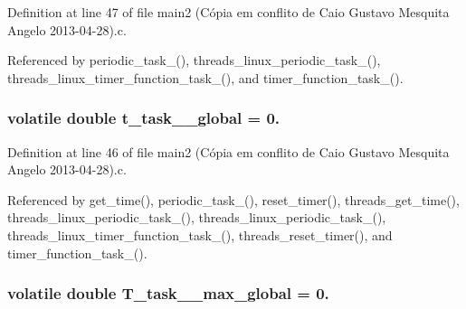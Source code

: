 Definition at line 47 of file main2 (\-Cópia em conflito de Caio Gustavo Mesquita Angelo 2013-\/04-\/28).\-c.



Referenced by periodic\-\_\-task\-\_(), threads\-\_\-linux\-\_\-periodic\-\_\-task\-\_(), threads\-\_\-linux\-\_\-timer\-\_\-function\-\_\-task\-\_(), and timer\-\_\-function\-\_\-task\-\_().

\hypertarget{main2_01_07C_xC3_xB3pia_01em_01conflito_01de_01Caio_01Gustavo_01Mesquita_01Angelo_012013-04-28_08_8c_a2a2a647912528f7aa86812528dbfe02f}{
\subsubsection[{t\-\_\-task\-\_\-1\-\_\-global}]{\setlength{\rightskip}{0pt plus 5cm}volatile double t\-\_\-task\-\_\-\_\-global = 0.}}\label{main2_01_07C_xC3_xB3pia_01em_01conflito_01de_01Caio_01Gustavo_01Mesquita_01Angelo_012013-04-28_08_8c_a2a2a647912528f7aa86812528dbfe02f}


Definition at line 46 of file main2 (\-Cópia em conflito de Caio Gustavo Mesquita Angelo 2013-\/04-\/28).\-c.



Referenced by get\-\_\-time(), periodic\-\_\-task\-\_(), reset\-\_\-timer(), threads\-\_\-get\-\_\-time(), threads\-\_\-linux\-\_\-periodic\-\_\-task\-\_(), threads\-\_\-linux\-\_\-periodic\-\_\-task\-\_(), threads\-\_\-linux\-\_\-timer\-\_\-function\-\_\-task\-\_(), threads\-\_\-reset\-\_\-timer(), and timer\-\_\-function\-\_\-task\-\_().

\hypertarget{main2_01_07C_xC3_xB3pia_01em_01conflito_01de_01Caio_01Gustavo_01Mesquita_01Angelo_012013-04-28_08_8c_aa714e30d738039b5bf665742beb31739}{
\subsubsection[{T\-\_\-task\-\_\-1\-\_\-max\-\_\-global}]{\setlength{\rightskip}{0pt plus 5cm}volatile double T\-\_\-task\-\_\-\_\-max\-\_\-global = 0.}}\label{main2_01_07C_xC3_xB3pia_01em_01conflito_01de_01Caio_01Gustavo_01Mesquita_01Angelo_012013-04-28_08_8c_aa714e30d738039b5bf665742beb31739}


